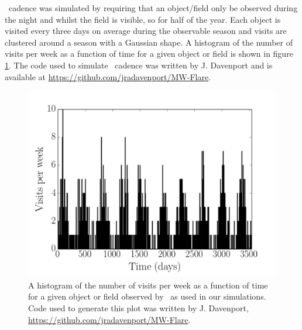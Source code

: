 \LSST\ cadence was simulated by requiring that an object/field only be
observed during the night and whilst the field is visible, so for half of the
year.
Each object is visited every three days on average during the observable
season and visits are clustered around a season with a Gaussian shape.
A histogram of the number of visits per week as a function of time for a given
object or field is shown in figure \ref{fig:cadence_hist}.
The code used to simulate \LSST\ cadence was written by J. Davenport and is
available at \url{https://github.com/jradavenport/MW-Flare}.

\begin{figure}
\begin{center}
\includegraphics[width=6in, clip=true]{figures/cadence_hist}
\caption[An \LSST\ cadence histogram.]
{A histogram of the number of visits per week as a function of time
for a given object or field observed by \LSST\ as used in our simulations.
Code used to generate this plot was written by J. Davenport,
\url{https://github.com/jradavenport/MW-Flare}.}
\label{fig:cadence_hist}
\end{center}
\end{figure}


